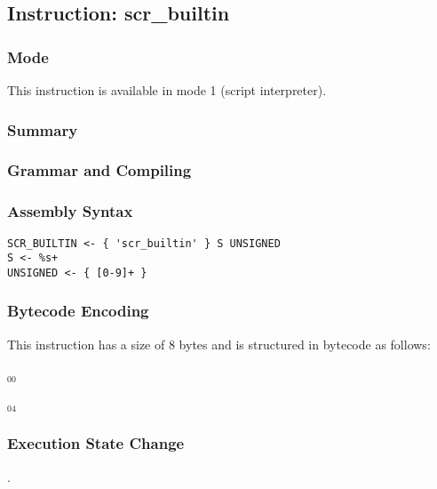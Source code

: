 \subsection{Instruction: scr\_builtin}

\subsubsection{Mode}
This instruction is available in mode 1 (script interpreter).
\subsubsection{Summary}


\subsubsection{Grammar and Compiling}


\subsubsection{Assembly Syntax}

\begin{myquote}
\begin{verbatim}
SCR_BUILTIN <- { 'scr_builtin' } S UNSIGNED
S <- %s+
UNSIGNED <- { [0-9]+ }
\end{verbatim}
\end{myquote}

\subsubsection{Bytecode Encoding}

This instruction has a size of 8 bytes and is structured in bytecode as follows:

$_{00}$\ 



$_{04}$\ 


\subsubsection{Execution State Change}

.


